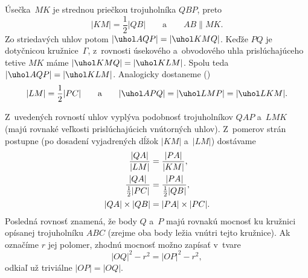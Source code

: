 {%
Úsečka~$MK$ je strednou priečkou trojuholníka $QBP$, preto
$$
|KM|=\frac12|QB|\qquad\text{a}\qquad AB\parallel MK.
$$
Zo striedavých uhlov potom $|\uhol AQP|=|\uhol KMQ|$. Keďže $PQ$ je dotyčnicou kružnice~$\Gamma$, z~rovnosti úsekového a~obvodového uhla prislúchajúceho tetive $MK$ máme $|\uhol KMQ|=|\uhol KLM|$. Spolu teda $|\uhol AQP|=|\uhol KLM|$. Analogicky dostaneme (\obr)
$$
|LM|=\frac12|PC|\qquad\text{a}\qquad |\uhol APQ|=|\uhol LMP|=|\uhol LKM|.
$$
%

Z~uvedených rovností uhlov vyplýva podobnosť trojuholníkov $QAP$ a~$LMK$ (majú rovnaké veľkosti prislúchajúcich vnútorných uhlov). Z~pomerov strán postupne (po dosadení vyjadrených dĺžok $|KM|$ a~$|LM|$) dostávame
$$
\aligned
\frac{|QA|}{|LM|}&=\frac{|PA|}{|KM|},\\
\frac{|QA|}{\frac12|PC|}&=\frac{|PA|}{\frac12|QB|},\\
|QA|\cdot|QB|&=|PA|\cdot|PC|.
\endaligned
$$
Posledná rovnosť znamená, že body $Q$ a~$P$ majú rovnakú mocnosť ku kružnici opísanej trojuholníku $ABC$ (zrejme oba body ležia vnútri tejto kružnice). Ak označíme $r$ jej polomer, zhodnú mocnosť možno zapísať v~tvare
$$
|OQ|^2-r^2=|OP|^2-r^2,
$$
odkiaľ už triviálne $|OP|=|OQ|$.
}

